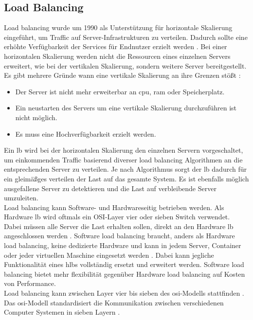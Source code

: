 \subsection{Load Balancing} \label{s:load-balancing}
Load balancing wurde um 1990 als Unterstützung für horizontale Skalierung eingeführt, um Traffic auf Server-Infrastrukturen zu verteilen. Dadurch sollte eine erhöhte Verfügbarkeit der Services für Endnutzer erzielt werden \cite{LoadBalancing101}.
Bei einer horizontalen Skalierung werden nicht die Ressourcen eines einzelnen Servers erweitert, wie bei der vertikalen Skalierung, sondern weitere Server bereitgestellt. Es gibt mehrere Gründe wann eine vertikale Skalierung an ihre Grenzen stö{\ss}t \cite{bourkeServerLoadBalancing2001}:
\begin{itemize}
    \item Der Server ist nicht mehr erweiterbar an \acs{cpu}, \acs{ram} oder Speicherplatz.
    \item Ein neustarten des Servers um eine vertikale Skalierung durchzuführen ist nicht möglich.
    \item Es muss eine Hochverfügbarkeit erzielt werden.
\end{itemize}
Ein \acl{lb} wird bei der horizontalen Skalierung den einzelnen Servern vorgeschaltet, um einkommenden Traffic basierend diverser load balancing Algorithmen an die entsprechenden Server zu verteilen.
Je nach Algorithmus sorgt der \ac{lb} dadurch für ein gleimä{\ss}ges verteilen der Last auf das gesamte System. Es ist ebenfalls möglich ausgefallene Server zu detektieren und die Last auf verbleibende Server umzuleiten.
\cite{LoadBalancing101}
\\
Load balancing kann Software- und Hardwareseitig betrieben werden. Als Hardware \ac{lb} wird oftmals ein OSI-Layer vier oder sieben Switch verwendet. Dabei müssen alle Server die Last erhalten sollen, direkt an den Hardware \ac{lb} angeschlossen werden \cite{WasIstLoad2016}.
Software load balancing braucht, anders als Hardware load balancing, keine dedizierte Hardware und kann in jedem Server, Container oder jeder virtuellen Maschine eingesetzt werden \cite{SoftwareLoadBalancing}.
Dabei kann jegliche Funktionalität eines \acp{hlb} vollständig ersetzt und erweitert werden. Software load balancing bietet mehr flexibilität gegenüber Hardware load balancing auf Kosten von Performance.
\cite{WhatLoadBalancer}
\\
Load balancing kann zwischen Layer vier bis sieben des \ac{osi}-Modells stattfinden \cite{WhatLoadBalancer}.
Das \ac{osi}-Modell standardisiert die Kommunikation zwischen verschiedenen Computer Systemen in sieben Layern \cite{WhatOSIModel}.

